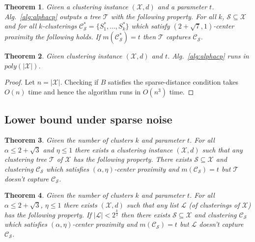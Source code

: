 \documentclass[letterpaper,12pt,titlepage,oneside,final]{book}
\newtheorem{theorem}{Theorem}
\newcommand{\mc}{\mathcal}
\begin{document}
\begin{theorem}
\label{thm:alphacpnoise}
Given a clustering instance $(\mc X, d)$ and a parameter $t$. Alg.~\ref{alg:alphacp} outputs a tree $\mc T$ with the following property. For all $k$, $\mc S \subseteq \mc X$ and for all $k$-clusterings $\mc C^*_{\mc S} = \{S_1^*, \ldots, S_k^*\}$ which satisfy $(2+\sqrt{7}, 1)$-center proximity the following holds. If $m(\mc C_{\mc S}^*) = t$ then $\mc T$ captures $\mc C_{\mc S}$.
\end{theorem}

\begin{theorem}
\label{thm:algcptime}
Given clustering instance $(\mc X, d)$ and $t$. Alg.~\ref{alg:alphacp} runs in  $poly(|\mc X|)$.
\end{theorem}

\begin{proof}
Let $n = |\mc X|$. Checking if $B$ satisfies the sparse-distance condition takes $O(n)$ time and hence the algorithm runs in $O(n^3)$ time.
\end{proof}

\subsection{Lower bound under sparse noise}
\label{section:alphaLowerBoundSparse}
\begin{theorem}
\label{thm:noalgalphacp}
Given the number of clusters $k$ and parameter $t$. For all $\alpha \le 2+\sqrt{3}$ and $\eta \le 1$ there exists a clustering instance $(\mc X, d)$ such that any clustering tree $\mc T$ of $\mc X$ has  the following property. There exists $\mc S \subseteq \mc X$ and clustering $\mc C_{\mc S}$ which satisfies $(\alpha, \eta)$-center proximity and $ m(\mc C_{\mc S}) = t$ but $\mc T$ doesn't capture $\mc C_{\mc S}$.
\end{theorem}

\begin{theorem}
\label{thm:nolistalphacp}
Given the number of clusters $k$ and parameter $t$. For all $\alpha \le 2+\sqrt{3}$, $\eta \le 1$ there exists $(\mc X, d)$ such that any list $\mc L$ (of clusterings of $\mc X$) has  the following property. If $|\mc L| < 2^{\frac{k}{2}}$ then there exists $\mc S \subseteq \mc X$ and clustering $\mc C_{\mc S}$ which satisfies $(\alpha, \eta)$-center proximity and $ m(\mc C_{\mc S}) = t$ but $\mc L$ doesn't capture $\mc C_{\mc S}$.
\end{theorem}
\end{document}
